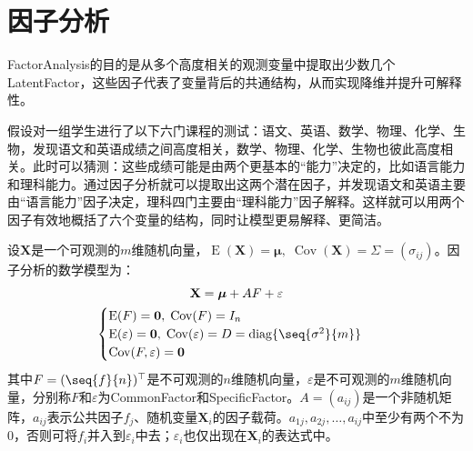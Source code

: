 \section{因子分析}
\gls{FactorAnalysis}的目的是从多个高度相关的观测变量中提取出少数几个\gls{LatentFactor}，这些因子代表了变量背后的共通结构，从而实现降维并提升可解释性。\par
假设对一组学生进行了以下六门课程的测试：语文、英语、数学、物理、化学、生物，发现语文和英语成绩之间高度相关，数学、物理、化学、生物也彼此高度相关。此时可以猜测：这些成绩可能是由两个更基本的“能力”决定的，比如语言能力和理科能力。通过因子分析就可以提取出这两个潜在因子，并发现语文和英语主要由“语言能力”因子决定，理科四门主要由“理科能力”因子解释。这样就可以用两个因子有效地概括了六个变量的结构，同时让模型更易解释、更简洁。
\begin{definition}
	设$\mathbf{X}$是一个可观测的$m$维随机向量，$\operatorname{E}(\mathbf{X})=\boldsymbol{\mu},\;\operatorname{Cov}(\mathbf{X})=\Sigma=(\sigma_{ij})$。因子分析的数学模型为：
	\begin{gather*}
		\mathbf{X}=\boldsymbol{\mu}+AF+\varepsilon \\
		\begin{cases}
			\operatorname{E}(F)=\mathbf{0},\;\operatorname{Cov}(F)=I_n \\
			\operatorname{E}(\varepsilon)=\mathbf{0},\;\operatorname{Cov}(\varepsilon)=D=\operatorname{diag}\{\seq{\sigma^2}{m}\} \\
			\operatorname{Cov}(F,\varepsilon)=\mathbf{0}
		\end{cases}
	\end{gather*}
	其中$F=(\seq{f}{n})^{\top}$是不可观测的$n$维随机向量，$\varepsilon$是不可观测的$m$维随机向量，分别称$F$和$\varepsilon$为\gls{CommonFactor}和\gls{SpecificFactor}。$A=(a_{ij})$是一个非随机矩阵，$a_{ij}$表示公共因子$f_j$、随机变量$\mathbf{X}_i$的因子载荷。$a_{1j},a_{2j},\dots,a_{ij}$中至少有两个不为$0$，否则可将$f_i$并入到$\varepsilon_i$中去；$\varepsilon_i$也仅出现在$\mathbf{X}_i$的表达式中。
\end{definition}
